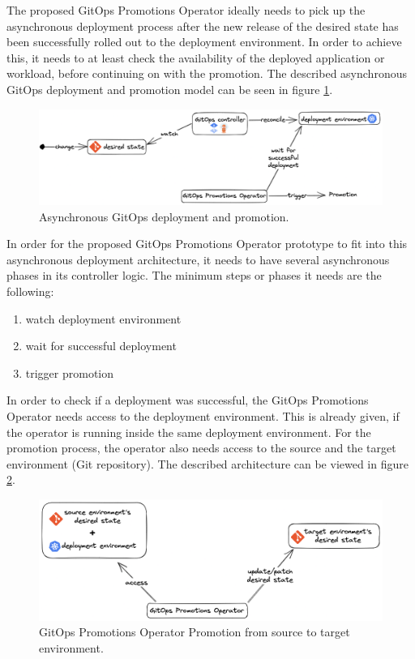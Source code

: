 The proposed GitOps Promotions Operator ideally needs to pick up
the asynchronous deployment process after the new release of the desired state
has been successfully rolled out to the deployment environment.
In order to achieve this,
it needs to at least check the availability of the deployed application or workload,
before continuing on with the promotion.
The described asynchronous GitOps deployment and promotion model can be seen in figure
\ref{fig:async-gitops-promo-arch}.

\begin{figure}[h]
	\centering
	\includegraphics[width=1.00\linewidth]{assets/async-gitops-promo-arch.png}
	\caption{Asynchronous GitOps deployment and promotion.
	}
	\label{fig:async-gitops-promo-arch}	
\end{figure}

In order for the proposed GitOps Promotions Operator prototype to fit into
this asynchronous deployment architecture,
it needs to have several asynchronous phases in its controller logic.
The minimum steps or phases it needs are the following:

\begin{enumerate}
	\item watch deployment environment
	\item wait for successful deployment
	\item trigger promotion
\end{enumerate}

In order to check if a deployment was successful,
the GitOps Promotions Operator needs access to the deployment environment. This is already given,
if the operator is running inside the same deployment environment.
For the promotion process, the operator also needs access
to the source and the target
environment (Git repository).
The described architecture can be viewed in figure \ref{fig:operator-access-source-target-envs}.

\begin{figure}[h]
	\centering
	\includegraphics[width=1.00\linewidth]{assets/operator-access-source-target-envs.png}
	\caption{GitOps Promotions Operator Promotion from source to target environment.
	}
	\label{fig:operator-access-source-target-envs}	
\end{figure}

